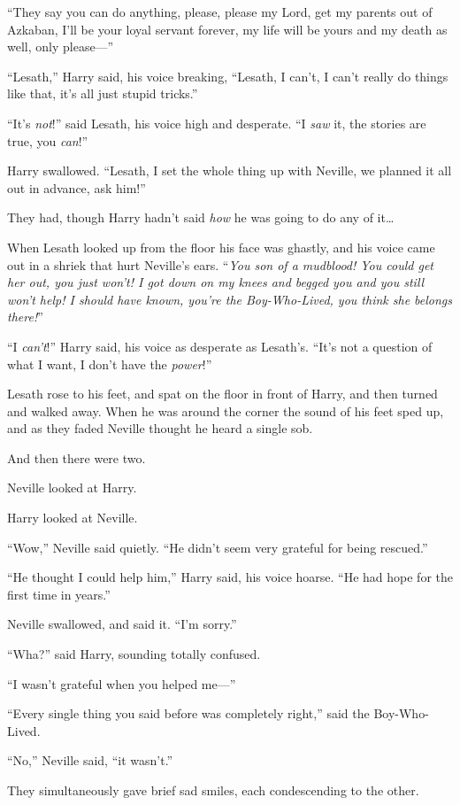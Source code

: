 “They say you can do anything, please, please my Lord, get my parents out of Azkaban, I’ll be your loyal servant forever, my life will be yours and my death as well, only please—”

“Lesath,” Harry said, his voice breaking, “Lesath, I can’t, I can’t really do things like that, it’s all just stupid tricks.”

“It’s \emph{not}!” said Lesath, his voice high and desperate. “I \emph{saw} it, the stories are true, you \emph{can}!”

Harry swallowed. “Lesath, I set the whole thing up with Neville, we planned it all out in advance, ask him!”

They had, though Harry hadn’t said \emph{how} he was going to do any of it…

When Lesath looked up from the floor his face was ghastly, and his voice came out in a shriek that hurt Neville’s ears. “\emph{You son of a mudblood! You could get her out, you just won’t! I got down on my knees and begged you and you still won’t help! I should have known, you’re the Boy-Who-Lived, you think she belongs there!}”

“I \emph{can’t}!” Harry said, his voice as desperate as Lesath’s. “It’s not a question of what I want, I don’t have the \emph{power}!”

Lesath rose to his feet, and spat on the floor in front of Harry, and then turned and walked away. When he was around the corner the sound of his feet sped up, and as they faded Neville thought he heard a single sob.

And then there were two.

Neville looked at Harry.

Harry looked at Neville.

“Wow,” Neville said quietly. “He didn’t seem very grateful for being rescued.”

“He thought I could help him,” Harry said, his voice hoarse. “He had hope for the first time in years.”

Neville swallowed, and said it. “I’m sorry.”

“Wha?” said Harry, sounding totally confused.

“I wasn’t grateful when you helped me—”

“Every single thing you said before was completely right,” said the Boy-Who-Lived.

“No,” Neville said, “it wasn’t.”

They simultaneously gave brief sad smiles, each condescending to the other.

